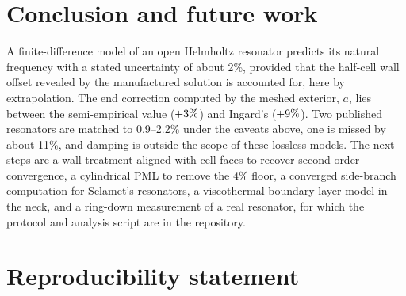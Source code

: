 \documentclass[11pt,a4paper]{article}
\begin{document}
\section{Conclusion and future work}

A finite-difference model of an open Helmholtz resonator predicts its natural frequency
with a stated uncertainty of about 2\%, provided that the half-cell wall offset revealed by
the manufactured solution is accounted for, here by extrapolation. The end correction
computed by the meshed exterior, \dLext$a$, lies between the semi-empirical value
($+3\%$) and Ingard's ($+9\%$). Two published resonators are matched
to 0.9--2.2\% under the caveats above, one is missed by about 11\%, and damping is outside
the scope of these lossless models. The next steps are a wall treatment aligned with cell
faces to recover second-order convergence, a cylindrical PML to remove the 4\% floor, a
converged side-branch computation for Selamet's resonators, a viscothermal boundary-layer
model in the neck, and a ring-down measurement of a real resonator, for which the protocol
and analysis script are in the repository.

\section*{Reproducibility statement}
\end{document}
